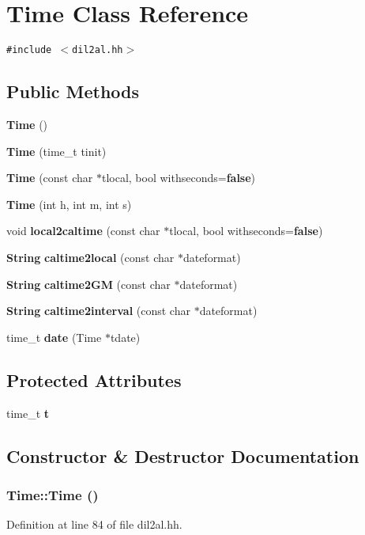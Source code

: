 \section{Time  Class Reference}
\label{classTime}
{\tt \#include $<$dil2al.hh$>$}

\subsection*{Public Methods}
\begin{CompactItemize}
\item 
{\bf Time} ()
\item 
{\bf Time} (time\_\-t tinit)
\item 
{\bf Time} (const char $\ast$tlocal, bool withseconds={\bf false})
\item 
{\bf Time} (int h, int m, int s)
\item 
void {\bf local2caltime} (const char $\ast$tlocal, bool withseconds={\bf false})
\item 
{\bf String} {\bf caltime2local} (const char $\ast$dateformat)
\item 
{\bf String} {\bf caltime2GM} (const char $\ast$dateformat)
\item 
{\bf String} {\bf caltime2interval} (const char $\ast$dateformat)
\item 
time\_\-t {\bf date} (Time $\ast$tdate)
\end{CompactItemize}
\subsection*{Protected Attributes}
\begin{CompactItemize}
\item 
time\_\-t {\bf t}
\end{CompactItemize}


\subsection{Constructor \& Destructor Documentation}
\subsubsection{\setlength{\rightskip}{0pt plus 5cm}Time::Time ()\hspace{0.3cm}{\tt  [inline]}}\label{classTime_a0}




Definition at line 84 of file dil2al.hh.

